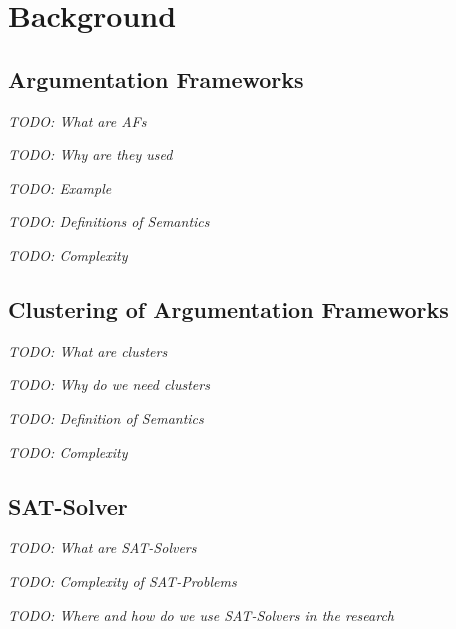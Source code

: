 \chapter{Background}

\section{Argumentation Frameworks}

\textit{TODO: What are AFs}

\textit{TODO: Why are they used}

\textit{TODO: Example}

\textit{TODO: Definitions of Semantics}

\textit{TODO: Complexity}



\section{Clustering of Argumentation Frameworks}

\textit{TODO: What are clusters}

\textit{TODO: Why do we need clusters}

\textit{TODO: Definition of Semantics}

\textit{TODO: Complexity}


\section{SAT-Solver}

\textit{TODO: What are SAT-Solvers}

\textit{TODO: Complexity of SAT-Problems}

\textit{TODO: Where and how do we use SAT-Solvers in the research}

